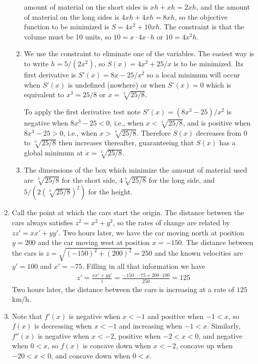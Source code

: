 \documentclass{article}
\begin{document}
\begin{enumerate}
\begin{enumerate}
    amount of material on the short sides is $xh+xh=2xh$, and the amount
    of material on the long sides is $4xh+4xh=8xh$, so the objective
    function to be minimized is $S=4x^2+10xh$.  The constraint is that
    the volume must be 10 units, so $10=x\cdot 4x\cdot h$ or $10=4x^2h$.
  \item We use the constraint to eliminate one of the variables.  The
    easiest way is to write $h=5/(2x^2)$, so
    $S(x) = 4x^2 + 25/x$
    is to be minimized.  Its first derivative is $S'(x)=8x-25/x^2$ so a
    local minimum will occur when $S'(x)$ is undefined (nowhere) or 
    when $S'(x)=0$ which is equivalent to $x^3=25/8$ or $x=\sqrt[3]{25/8}$.

    To apply the first derivative test note $S'(x)=(8x^3-25)/x^2$ is
    negative when $8x^3-25<0$, i.e., when $x<\sqrt[3]{25/8}$, and is
    positive when $8x^3-25>0$, i.e., when $x>\sqrt[3]{25/8}$.  Therefore
    $S(x)$ decreases from $0$ to $\sqrt[3]{25/8}$ then increases thereafter,
    guaranteeing that $S(x)$ has a global minimum at $x=\sqrt[3]{25/8}$.
  \item The dimensions of the box which minimize the amount of material
    used are $\sqrt[3]{25/8}$ for the short side, $4\sqrt[3]{25/8}$ for the
    long side, and $5/(2(\sqrt[3]{25/8})^2)$ for the height.
  \end{enumerate}
\item Call the point at which the cars start the origin.  
  The distance between the cars always satisfies $z^2=x^2+y^2$, so the
  rates of change are related by $zz'=xx'+yy'$.
  Two hours later,
  we have the car moving north at position $y=200$ and the car moving west
  at position $x=-150$.  The distance between the cars is $z=\sqrt{(-150)^2
  +(200)^2}= 250$ and the known velocities are $y'=100$ and $x'=-75$.
  Filling in all that information we have
  \begin{align*}
    z' = \frac{xx'+yy'}{z}
    = \frac{-150\cdot -75 + 200\cdot 100}{250} = 125
  \end{align*}
  Two hours later, the distance between the cars is increasing at a rate
  of $125$ km/h.
\item Note that $f'(x)$ is negative when $x<-1$ and positive when $-1<x$,
  so $f(x)$ is decreasing when $x<-1$ and increasing when $-1<x$.  Similarly,
  $f''(x)$ is negative when $x<-2$, positive when $-2<x<0$, and negative
  when $0<x$, so $f(x)$ is concave down when $x<-2$, concave up when
  $-20<x<0$, and concave down when $0<x$.
  \begin{enumerate}

\end{enumerate}
\end{enumerate}
\end{document}
